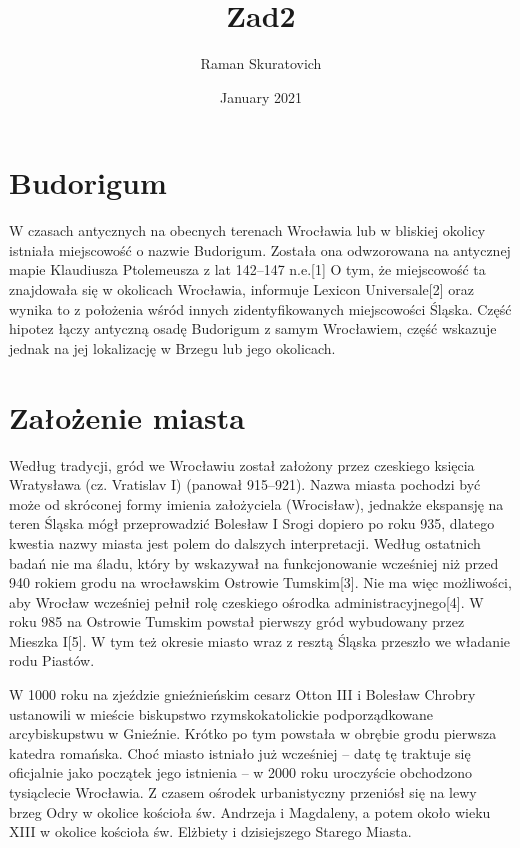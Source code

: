 \documentclass{article}
\title{Zad2}
\author{Raman Skuratovich}
\date{January 2021}
\begin{document}
\maketitle
\tableofcontents

\section{Budorigum}
\hrulefill

W czasach antycznych na obecnych terenach Wrocławia lub w bliskiej okolicy istniała miejscowość o nazwie Budorigum. Została ona odwzorowana na antycznej mapie Klaudiusza Ptolemeusza z lat 142–147 n.e.[1] O tym, że miejscowość ta znajdowała się w okolicach Wrocławia, informuje Lexicon Universale[2] oraz wynika to z położenia wśród innych zidentyfikowanych miejscowości Śląska. Część hipotez łączy antyczną osadę Budorigum z samym Wrocławiem, część wskazuje jednak na jej lokalizację w Brzegu lub jego okolicach.

\section{Założenie miasta}
\hrulefill

Według tradycji, gród we Wrocławiu został założony przez czeskiego księcia Wratysława (cz. Vratislav I) (panował 915–921). Nazwa miasta pochodzi być może od skróconej formy imienia założyciela (Wrocisław), jednakże ekspansję na teren Śląska mógł przeprowadzić Bolesław I Srogi dopiero po roku 935, dlatego kwestia nazwy miasta jest polem do dalszych interpretacji. Według ostatnich badań nie ma śladu, który by wskazywał na funkcjonowanie wcześniej niż przed 940 rokiem grodu na wrocławskim Ostrowie Tumskim[3]. Nie ma więc możliwości, aby Wrocław wcześniej pełnił rolę czeskiego ośrodka administracyjnego[4]. W roku 985 na Ostrowie Tumskim powstał pierwszy gród wybudowany przez Mieszka I[5]. W tym też okresie miasto wraz z resztą Śląska przeszło we władanie rodu Piastów.

W 1000 roku na zjeździe gnieźnieńskim cesarz Otton III i Bolesław Chrobry ustanowili w mieście biskupstwo rzymskokatolickie podporządkowane arcybiskupstwu w Gnieźnie. Krótko po tym powstała w obrębie grodu pierwsza katedra romańska. Choć miasto istniało już wcześniej – datę tę traktuje się oficjalnie jako początek jego istnienia – w 2000 roku uroczyście obchodzono tysiąclecie Wrocławia. Z czasem ośrodek urbanistyczny przeniósł się na lewy brzeg Odry w okolice kościoła św. Andrzeja i Magdaleny, a potem około wieku XIII w okolice kościoła św. Elżbiety i dzisiejszego Starego Miasta.
\end{document}
